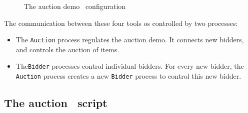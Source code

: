 \begin{figure}[htb]
\centerline{}
\caption{The auction demo \TB\ configuration}
\label{auction-impl}
\end{figure}


The communication between these four tools os controlled by two processes:
\begin{itemize}
\item The {\tt Auction} process regulates the auction demo. 
      It connects new bidders,
      and controls the auction of items.
\item The{\tt Bidder} processes control individual bidders.
      For every new bidder, the {\tt Auction} process creates a new
      {\tt Bidder} process to control this new bidder.
\end{itemize}


\subsection{The auction \TB\ script}


